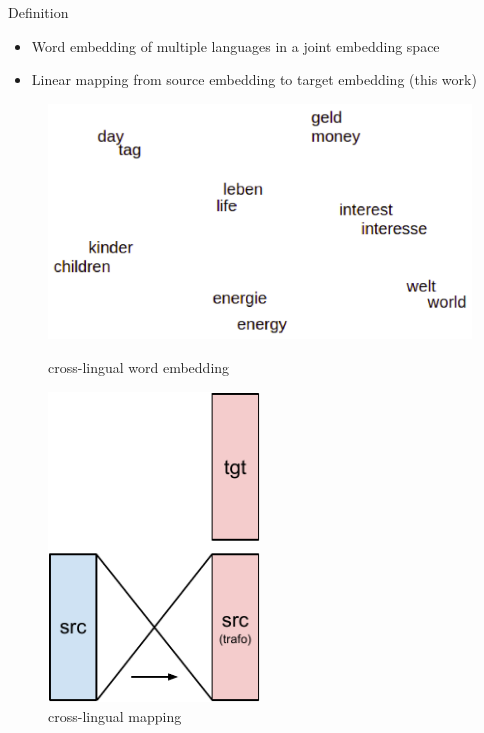 \documentclass[11pt, a4paper, landscape]{article}
\begin{document}
	Definition
	\begin{itemize}
		\item Word embedding of multiple languages in a joint embedding space		
		\item Linear mapping from source embedding to target embedding (this work)
	\end{itemize}
	\begin{figure}
	\begin{minipage}[b]{0.55\textwidth}
	\includegraphics[width=14cm]{crossembedding}
	\caption{cross-lingual word embedding}	
	
	\end{minipage}
	\begin{minipage}[b]{0.4\textwidth}
		\centering
		\includegraphics[width=0.5\textwidth]{cross-embed}
		\caption{cross-lingual mapping}

	\end{minipage}	
	\end{figure}
\end{document}
